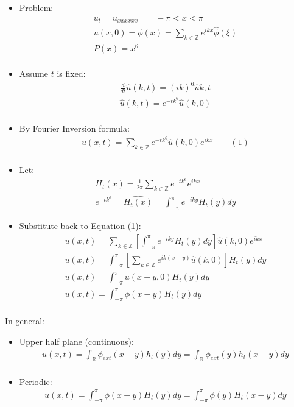 \documentclass[12pt, a4paper]{article}
\begin{document}
\begin{itemize}
    \item Problem:
    \begin{gather*}
        u_t = u_{xxxxxx} \qquad -\pi < x < \pi\\
        u(x, 0) = \phi(x) = \sum_{k \in \mathbb{Z}} e^{ikx}\hat{\phi}(\xi)\\
        P(x) = x^6\\
    \end{gather*}
    \item Assume $t$ is fixed:
    \begin{gather*}
        \frac{d}{dt} \hat{u}(k, t) =(ik)^6\hat{u}{k, t} \\
        \hat{u}(k, t) = e^{-tk^6}\hat{u}(k, 0) \\
    \end{gather*}
    \item By Fourier Inversion formula:
    \begin{gather*}
        u(x, t) = \sum_{k \in \mathbb{Z}} e^{-tk^6}\hat{u}(k, 0)e^{ikx} \qquad (1)\\
    \end{gather*}
    \item Let:
    \begin{gather*}
        H_t(x) = \frac{1}{2\pi}\sum_{k \in  \mathbb{Z}} e^{-tk^6}e^{ikx}\\
        e^{-tk^6} = \hat{H_t(x)} = \int_{-\pi}^{\pi}e^{-iky}H_t(y)dy
    \end{gather*}
    \item Substitute back to Equation (1):
    \begin{gather*}
        u(x, t) = \sum_{k \in \mathbb{Z}} \left[\int_{-\pi}^{\pi}e^{-iky}H_t(y)dy\right]\hat{u}(k, 0)e^{ikx}\\ 
        u(x, t) = \int_{-\pi}^{\pi}\left[\sum_{k \in \mathbb{Z}} e^{ik(x-y)}\hat{u}(k, 0)\right]H_t(y)dy\\
        u(x, t) = \int_{-\pi}^{\pi}u(x-y, 0)H_t(y)dy\\
        u(x, t) = \int_{-\pi}^{\pi}\phi(x-y)H_t(y)dy\\
    \end{gather*}
\end{itemize}
In general:
\begin{itemize}
    \item Upper half plane (continuous):
    \begin{gather*}
        u(x, t) = \int_{\mathbb{R}} \phi_{ext}(x-y) h_t(y)dy = \int_{\mathbb{R}} \phi_{ext}(y) h_t(x-y)dy\\
    \end{gather*}
    \item Periodic:
    \begin{gather*}
        u(x, t) = \int_{-\pi}^{\pi}\phi(x-y)H_t(y)dy = \int_{-\pi}^{\pi}\phi(y)H_t(x-y)dy\\
    \end{gather*}
\end{itemize}
\end{document}
